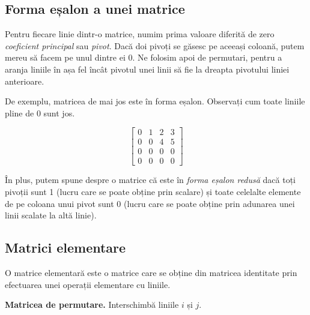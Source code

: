 \documentclass{exam}
\begin{document}
\subsection{Forma eșalon a unei matrice}

\par Pentru fiecare linie dintr-o matrice, numim prima valoare diferită de zero
\textit{coeficient principal} sau \textit{pivot}. Dacă doi pivoți se găsesc pe
aceeași coloană, putem mereu să facem pe unul dintre ei 0. Ne folosim apoi de
permutari, pentru a aranja liniile în așa fel încât pivotul unei linii să fie
la dreapta pivotului liniei anterioare.

\par De exemplu, matricea de mai jos este în forma eșalon. Observați cum toate
liniile pline de 0 sunt jos.

\begin{equation*}
	\begin{bmatrix}
		0 & 1 & 2 & 3 \\
		0 & 0 & 4 & 5 \\
		0 & 0 & 0 & 0 \\
		0 & 0 & 0 & 0
	\end{bmatrix}
\end{equation*}

\par În plus, putem spune despre o matrice că este în
\textit{forma eșalon redusă} dacă toți pivoții sunt 1 (lucru care se poate
obține prin scalare) și toate celelalte elemente de pe coloana unui pivot sunt 0
(lucru care se poate obține prin adunarea unei linii scalate la altă linie).

\subsection{Matrici elementare}

\par O matrice elementară este o matrice care se obține din matricea identitate
prin efectuarea unei operații elementare cu liniile.

\par \textbf{Matricea de permutare.} Interschimbă liniile $i$ și $j$.
\end{document}
